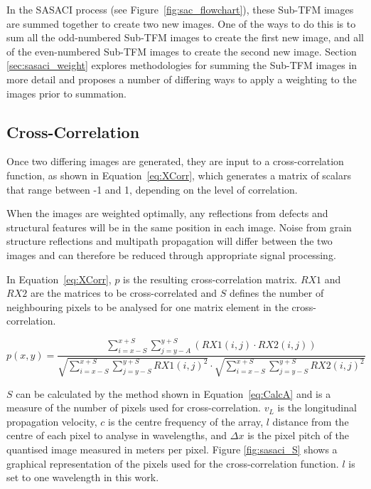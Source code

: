 In the SASACI process (see Figure~\ref{fig:sac_flowchart}), these Sub-TFM images are summed together to create two new images. One of the ways to do this is to sum all the odd-numbered Sub-TFM images to create the first new image, and all of the even-numbered Sub-TFM images to create the second new image. Section \ref{sec:sasaci_weight} explores methodologies for summing the Sub-TFM images in more detail and proposes a number of differing ways to apply a weighting to the images prior to summation.

\subsection{Cross-Correlation}
Once two differing images are generated, they are input to a cross-correlation function, as shown in Equation~\ref{eq:XCorr}, which generates a matrix of scalars that range between -1 and 1, depending on the level of correlation.

When the images are weighted optimally, any reflections from defects and structural features will be in the same position in each image. Noise from grain structure reflections and multipath propagation will differ between the two images and can therefore be reduced through appropriate signal processing.

In Equation~\ref{eq:XCorr}, $p$ is the resulting cross-correlation matrix. $RX1$ and $RX2$ are the matrices to be cross-correlated and $S$ defines the number of neighbouring pixels to be analysed for one matrix element in the cross-correlation.

 \begin{equation} \label{eq:XCorr}
p(x,y) = \frac{\sum\limits_{i = x - S}^{x+S} \sum\limits_{j = y - A}^{y+S} ( RX1(i,j) \cdot RX2(i,j) )}{\sqrt{\sum\limits_{i = x - S}^{x+S} \sum\limits_{j = y - S}^{y+S} RX1(i,j)^2} \cdot \sqrt{\sum\limits_{i = x - S}^{x+S} \sum\limits_{j = y - S}^{y+S} RX2(i,j)^2}}
 \end{equation}

$S$ can be calculated by the method shown in Equation~\ref{eq:CalcA} and is a measure of the number of pixels used for cross-correlation. $v_L$ is the longitudinal propagation velocity, $c$ is the centre frequency of the array, $l$ distance from the centre of each pixel to analyse in wavelengths, and $\Delta x$ is the pixel pitch of the quantised image measured in meters per pixel. Figure \ref{fig:sasaci_S} shows a graphical representation of the pixels used for the cross-correlation function. $l$ is set to one wavelength in this work.

